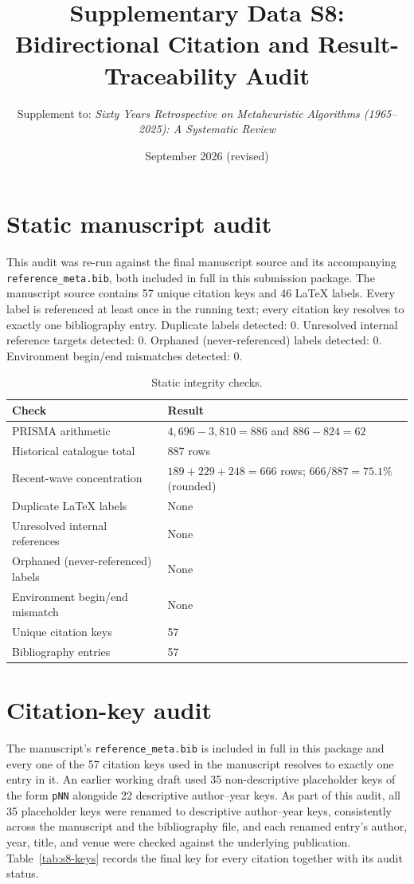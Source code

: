\documentclass[9pt]{article}
\title{Supplementary Data S8: Bidirectional Citation and Result-Traceability Audit}
\author{Supplement to: \textit{Sixty Years Retrospective on Metaheuristic Algorithms (1965--2025): A Systematic Review}}
\date{September 2026 (revised)}
\begin{document}
\maketitle
\section*{Static manuscript audit}
This audit was re-run against the final manuscript source and its accompanying \texttt{reference\_meta.bib}, both included in full in this submission package. The manuscript source contains 57 unique citation keys and 46 LaTeX labels. Every label is referenced at least once in the running text; every citation key resolves to exactly one bibliography entry. Duplicate labels detected: 0. Unresolved internal reference targets detected: 0. Orphaned (never-referenced) labels detected: 0. Environment begin/end mismatches detected: 0.

\begin{table}[h]
\centering
\caption{Static integrity checks.}
\begin{tabular}{P{8.8cm}P{5.2cm}}
\toprule
Check & Result\\
\midrule
PRISMA arithmetic & $4{,}696-3{,}810=886$ and $886-824=62$\\
Historical catalogue total & 887 rows\\
Recent-wave concentration & $189+229+248=666$ rows; $666/887=75.1\%$ (rounded)\\
Duplicate LaTeX labels & None\\
Unresolved internal references & None\\
Orphaned (never-referenced) labels & None\\
Environment begin/end mismatch & None\\
Unique citation keys & 57\\
Bibliography entries & 57\\
\bottomrule
\end{tabular}
\end{table}

\section*{Citation-key audit}
The manuscript's \texttt{reference\_meta.bib} is included in full in this package and every one of the 57 citation keys used in the manuscript resolves to exactly one entry in it. An earlier working draft used 35 non-descriptive placeholder keys of the form \texttt{pNN} alongside 22 descriptive author--year keys. As part of this audit, all 35 placeholder keys were renamed to descriptive author--year keys, consistently across the manuscript and the bibliography file, and each renamed entry's author, year, title, and venue were checked against the underlying publication. Table~\ref{tab:s8-keys} records the final key for every citation together with its audit status.
\end{document}
